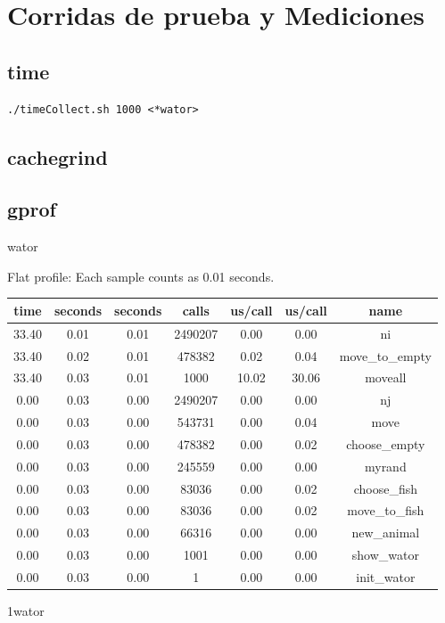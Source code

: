 \documentclass[a4paper,10pt]{article}
\begin{document}
\newpage

\section{Corridas de prueba y Mediciones}

\subsection{time}
\begin{verbatim}
./timeCollect.sh 1000 <*wator>
\end{verbatim}



\subsection{cachegrind}

\subsection{gprof}
wator

Flat profile:
Each sample counts as 0.01 seconds.
\begin{center}
  \begin{tabular}{| c | c | c | c | c | c | c |}
    \hline
 time &   seconds &   seconds &    calls &  us/call &   us/call &   name \\ \hline    
 33.40 &      0.01 &     0.01 &  2490207 &     0.00 &      0.00 &   ni \\ \hline
 33.40 &      0.02 &     0.01 &   478382 &     0.02 &      0.04 &   move\_to\_empty \\ \hline
 33.40 &      0.03 &     0.01 &     1000 &    10.02 &     30.06 &   moveall \\ \hline
  0.00 &      0.03 &     0.00 &  2490207 &     0.00 &      0.00 &   nj \\ \hline
  0.00 &      0.03 &     0.00 &   543731 &     0.00 &      0.04 &   move \\ \hline
  0.00 &      0.03 &     0.00 &   478382 &     0.00 &      0.02 &   choose\_empty \\ \hline
  0.00 &      0.03 &     0.00 &   245559 &     0.00 &      0.00 &   myrand \\ \hline
  0.00 &      0.03 &     0.00 &    83036 &     0.00 &      0.02 &   choose\_fish \\ \hline
  0.00 &      0.03 &     0.00 &    83036 &     0.00 &      0.02 &   move\_to\_fish \\ \hline
  0.00 &      0.03 &     0.00 &    66316 &     0.00 &      0.00 &   new\_animal \\ \hline
  0.00 &      0.03 &     0.00 &     1001 &     0.00 &      0.00 &   show\_wator \\ \hline
  0.00 &      0.03 &     0.00 &        1 &     0.00 &      0.00 &   init\_wator \\ \hline
  \end{tabular}
\end{center}
1wator
\end{document}
